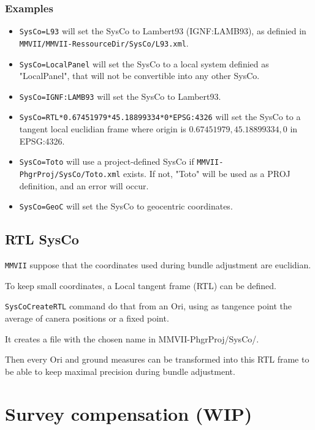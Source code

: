 \subsection{Examples}
\begin{itemize}
\item {\tt SysCo=L93} will set the SysCo to Lambert93 (IGNF:LAMB93), as definied in \\
{\tt MMVII/MMVII-RessourceDir/SysCo/L93.xml}.
\item {\tt SysCo=LocalPanel} will set the SysCo to a local system definied as "LocalPanel", that will not be convertible into any other SysCo.
\item {\tt SysCo=IGNF:LAMB93} will set the SysCo to Lambert93.
\item {\tt SysCo=RTL*0.67451979*45.18899334*0*EPSG:4326} will set the SysCo to a tangent local euclidian frame where origin is $0.67451979, 45.18899334, 0$ in EPSG:4326.
\item {\tt SysCo=Toto} will use a project-defined SysCo if {\tt MMVII-PhgrProj/SysCo/Toto.xml} exists. If not, "Toto" will be used as a PROJ definition, and an error will occur.
\item {\tt SysCo=GeoC} will set the SysCo to geocentric coordinates.

\end{itemize}


\section{RTL SysCo}
\label{SysCoRTL}
{\tt MMVII} suppose that the coordinates used during bundle adjustment are euclidian.

To keep small coordinates, a Local tangent frame (RTL) can be defined.

{\tt SysCoCreateRTL} command do that from an Ori, using as tangence point the average of canera positions or a fixed point.

It creates a file with the chosen name in {MMVII-PhgrProj/SysCo/}.

Then every Ori and ground measures can be transformed into this RTL frame to be able to keep maximal precision during bundle adjustment.




\chapter{Survey compensation (WIP)}
\label{Chap:TopoUser}


